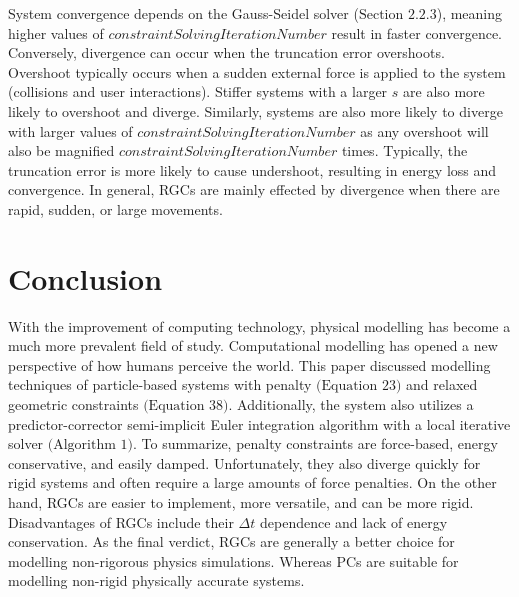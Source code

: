 \documentclass[12pt, letterpaper]{article}
\begin{document}
\noindent System convergence depends on the Gauss-Seidel solver ($\text{Section 2.2.3}$), meaning higher values of $constraintSolvingIterationNumber$ result in faster convergence. Conversely, divergence can occur when the truncation error overshoots. Overshoot typically occurs when a sudden external force is applied to the system (collisions and user interactions). Stiffer systems with a larger $s$ are also more likely to overshoot and diverge. Similarly, systems are also more likely to diverge with larger values of $constraintSolvingIterationNumber$ as any overshoot will also be magnified $constraintSolvingIterationNumber$ times. Typically, the truncation error is more likely to cause undershoot, resulting in energy loss and convergence. In general, RGCs are mainly effected by divergence when there are rapid, sudden, or large movements.

\section{Conclusion}
\hspace{\parindent}With the improvement of computing technology, physical modelling has become a much more prevalent field of study. Computational modelling has opened a new perspective of how humans perceive the world. This paper discussed modelling techniques of particle-based systems with penalty $\text{(Equation 23)}$ and relaxed geometric constraints $\text{(Equation 38)}$. Additionally, the system also utilizes a predictor-corrector semi-implicit Euler integration algorithm with a local iterative solver $\text{(Algorithm 1)}$. To summarize, penalty constraints are force-based, energy conservative, and easily damped. Unfortunately, they also diverge quickly for rigid systems and often require a large amounts of force penalties. On the other hand, RGCs are easier to implement, more versatile, and can be more rigid. Disadvantages of RGCs include their $\Delta t$ dependence and lack of energy conservation. As the final verdict, RGCs are generally a better choice for modelling non-rigorous physics simulations. Whereas PCs are suitable for modelling non-rigid physically accurate systems. 
\end{document}
